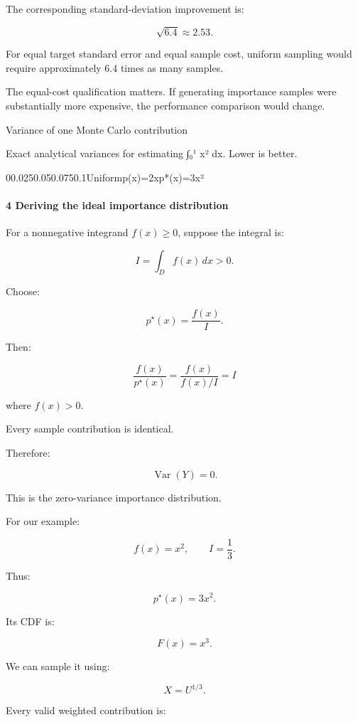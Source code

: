 The corresponding standard-deviation improvement is:

\[
 \sqrt{6.4}\approx2.53.
\]

For equal target standard error and equal sample cost, uniform sampling would require approximately 6.4 times as many samples.

The equal-cost qualification matters. If generating importance samples were substantially more expensive, the performance comparison would change.

Variance of one Monte Carlo contribution

Exact analytical variances for estimating ∫₀¹ x² dx. Lower is better.

00.0250.050.0750.1Uniformp(x)=2xp*(x)=3x²

\paragraph{4 Deriving the ideal importance distribution}\label{02-foundations-ii-ch029-deriving-the-ideal-importance-distribution}

\hypertarget{02-foundations-ii-ch029-deriving-the-ideal-importance-distribution}{}

For a nonnegative integrand \(f(x)\ge0\), suppose the integral is:

\[
 I=\int_Df(x)\,dx>0.
\]

Choose:

\[
 \boxed{ p^\star(x)=\frac{f(x)}I }.
\]

Then:

\[
 \frac{f(x)}{p^\star(x)} = \frac{f(x)}{f(x)/I} =I
\]

where \(f(x)>0\).

Every sample contribution is identical.

Therefore:

\[
 \boxed{ \operatorname{Var}(Y)=0 }.
\]

This is the zero-variance importance distribution.

For our example:

\[
 f(x)=x^2, \qquad I=\frac13.
\]

Thus:

\[
 \boxed{ p^\star(x)=3x^2 }.
\]

Its CDF is:

\[
 F(x)=x^3.
\]

We can sample it using:

\[
 \boxed{ X=U^{1/3} }.
\]

Every valid weighted contribution is:

